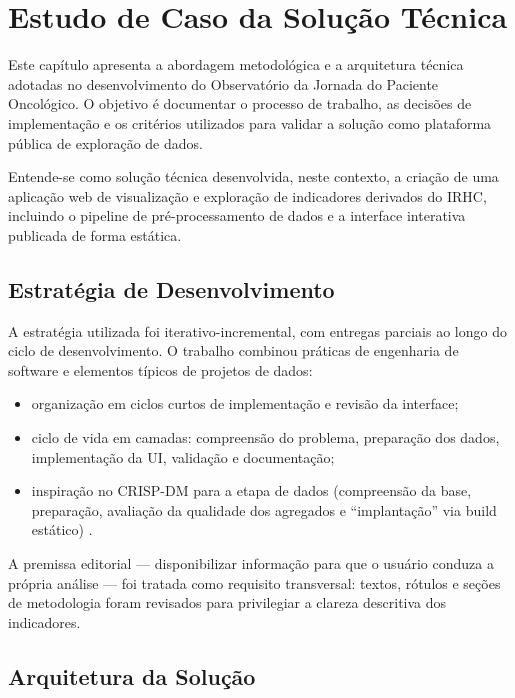 \chapter[Estudo de Caso da Solução Técnica]{Estudo de Caso da Solução Técnica}
\label{estudo}

Este capítulo apresenta a abordagem metodológica e a arquitetura técnica adotadas no desenvolvimento do Observatório da Jornada do Paciente Oncológico. O objetivo é documentar o processo de trabalho, as decisões de implementação e os critérios utilizados para validar a solução como plataforma pública de exploração de dados.

Entende-se como solução técnica desenvolvida, neste contexto, a criação de uma aplicação web de visualização e exploração de indicadores derivados do \acs{IRHC}, incluindo o pipeline de pré-processamento de dados e a interface interativa publicada de forma estática.

\section{Estratégia de Desenvolvimento}

A estratégia utilizada foi iterativo-incremental, com entregas parciais ao longo do ciclo de desenvolvimento. O trabalho combinou práticas de engenharia de software e elementos típicos de projetos de dados:

\begin{itemize}
	\item organização em ciclos curtos de implementação e revisão da interface;
	\item ciclo de vida em camadas: compreensão do problema, preparação dos dados, implementação da \acs{UI}, validação e documentação;
	\item inspiração no \acs{CRISP-DM} para a etapa de dados (compreensão da base, preparação, avaliação da qualidade dos agregados e ``implantação'' via build estático) \cite{crispdm}.
\end{itemize}

A premissa editorial --- disponibilizar informação para que o usuário conduza a própria análise --- foi tratada como requisito transversal: textos, rótulos e seções de metodologia foram revisados para privilegiar a clareza descritiva dos indicadores.

\section{Arquitetura da Solução}

